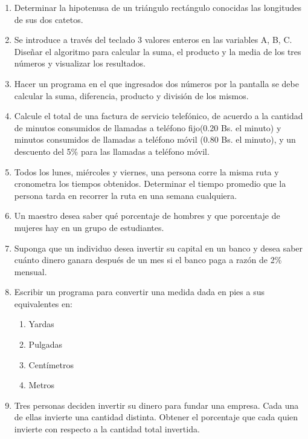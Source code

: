\documentclass{scrartcl}
\begin{document}
\begin{enumerate}
		\item Determinar la hipotenusa de un triángulo rectángulo conocidas las longitudes de sus dos catetos.
		
		\item Se introduce a través del teclado 3 valores enteros en las variables A, B, C. Diseñar el algoritmo para calcular la suma, el producto y la media de los tres números y visualizar los resultados.
		
		\item Hacer un programa en el que ingresados dos números por la pantalla se debe calcular la suma, diferencia, producto y división de los mismos.
		
		\item Calcule el total de una factura de servicio telefónico, de acuerdo a la cantidad de minutos consumidos de llamadas a teléfono fijo(0.20 Bs. el minuto) y minutos consumidos de llamadas a teléfono móvil (0.80 Bs. el minuto), y un descuento del 5\% para las llamadas a teléfono móvil.
		
		\item Todos los lunes, miércoles y viernes, una persona corre la misma ruta y cronometra los tiempos obtenidos. Determinar el tiempo promedio que la persona tarda en recorrer la ruta en una semana cualquiera.
		
		\item Un maestro desea saber qué porcentaje de hombres y que porcentaje de mujeres hay en un grupo de estudiantes.
		
		\item Suponga que un individuo desea invertir su capital en un banco y desea saber cuánto dinero ganara después de un mes si el banco paga a razón de 2\% mensual.
		
		\item Escribir un programa para convertir una medida dada en pies a sus equivalentes en:
		
			\begin{enumerate}
				\item Yardas
				\item Pulgadas
				\item Centímetros
				\item Metros
			\end{enumerate}

		\item Tres personas deciden invertir su dinero para fundar una empresa. Cada una de ellas invierte una cantidad distinta. Obtener el porcentaje que cada quien invierte con respecto a la cantidad total invertida.
		

\end{enumerate}
\end{document}
